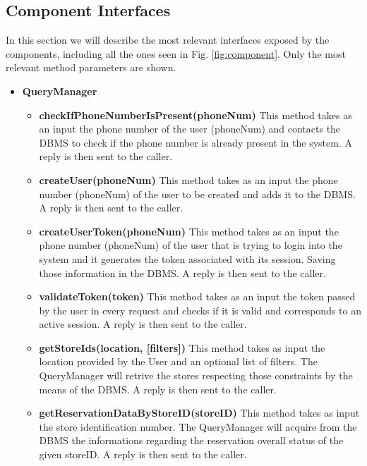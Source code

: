 \newpage

\subsection{Component Interfaces}
In this section we will describe the most relevant interfaces exposed by the components, including all the ones seen in Fig. \ref{fig:component}. Only the most relevant method parameters are shown. 

\begin{itemize}
    \item \textbf{QueryManager}
    \begin{itemize}
        \item \textbf{checkIfPhoneNumberIsPresent(phoneNum)}
        This method takes as an input the phone number of the user (phoneNum) and contacts the DBMS to check if the phone number is already present in the system. A reply is then sent to the caller.

        \item \textbf{createUser(phoneNum)}
        This method takes as an input the phone number (phoneNum) of the user to be created and adds it to the DBMS. A reply is then sent to the caller.

        \item \textbf{createUserToken(phoneNum)}
        This method takes as an input the phone number (phoneNum) of the user that is trying to login into the system and it generates the token associated with its session. Saving those information in the DBMS. A reply is then sent to the caller.

        \item \textbf{validateToken(token)}
        This method takes as an input the token passed by the user in every request and checks if it is valid and corresponds to an active session. A reply is then sent to the caller.

        \item \textbf{getStoreIds(location, [filters])}
        This method takes as input the location provided by the User and an optional list of filters. 
        The QueryManager will retrive the stores respecting those constraints by the means of the DBMS. A reply is then sent to the caller. 

        \item \textbf{getReservationDataByStoreID(storeID)}
        This method takes as input the store identification number. The QueryManager will acquire from the DBMS the informations regarding the reservation overall status of the given storeID. A reply is then sent to the caller.


\end{itemize}
\end{itemize}
